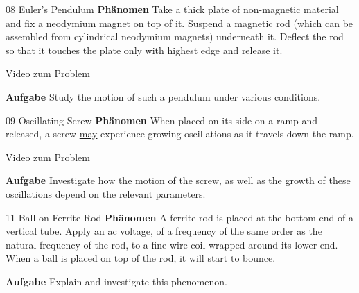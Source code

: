 \documentclass[9pt]{beamer}
\begin{document}
\begin{frame}{08 Euler's Pendulum}
\textbf{Phänomen} Take a thick plate of non-magnetic material and fix a neodymium magnet on top of it. Suspend a magnetic rod (which can be assembled from cylindrical neodymium magnets) underneath it. Deflect the rod so that it touches the plate only with highest edge and release it.

\vfill
\begin{center}
\color{blue}\href{https://www.youtube.com/watch?v=opWY6s0e9Yo}{Video zum Problem}\color{black}
\end{center}
\vfill
\textbf{Aufgabe} Study the \color{blue}motion \color{black} of such a pendulum under various \color{orange}conditions\color{black}.
\end{frame}

\begin{frame}{09 Oscillating Screw}
\textbf{Phänomen} When placed on its side on a ramp and released, a screw \underline{may} experience growing oscillations as it travels down the ramp.
\vfill
\begin{center}
\color{blue}\href{}{Video zum Problem}\color{black}
\end{center}
\vfill
\textbf{Aufgabe} Investigate how the \color{blue}motion \color{black} of the screw, as well as the \color{blue}growth \color{black} of these oscillations depend on the \color{orange}relevant parameters\color{black}.
\end{frame}

\begin{frame}{11 Ball on Ferrite Rod}
\textbf{Phänomen} A ferrite rod is placed at the bottom end of a vertical tube. Apply an ac voltage, of a frequency of the same order as the natural frequency of the rod, to a fine wire coil wrapped around its lower end. When a ball is placed on top of the rod, it will start to bounce. 

\vfill
\begin{center}
\end{center}
\par
\vfill

\textbf{Aufgabe} Explain and investigate this phenomenon.
\end{frame}
\end{document}
